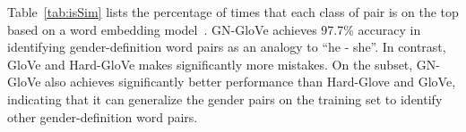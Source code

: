 Table~\ref{tab:isSim} lists the percentage of times that each class of pair is on the top based on a word embedding model~\cite{mikolov2013linguistic}. GN-GloVe achieves 97.7\% accuracy in identifying gender-definition word pairs as an analogy to ``he - she''. In contrast, GloVe and Hard-GloVe makes significantly more mistakes. On the subset, GN-GloVe also achieves significantly better performance than Hard-Glove and GloVe, indicating that it can generalize the gender pairs on the training set to identify other gender-definition word pairs. 


